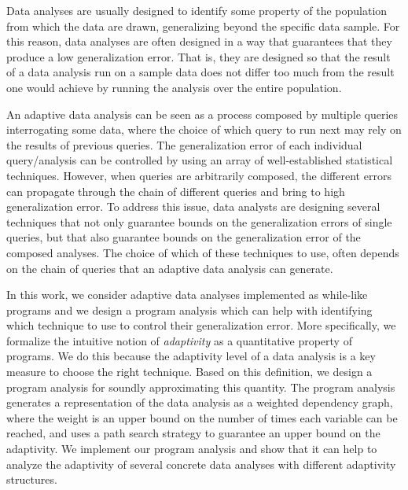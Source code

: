 Data analyses are usually designed to identify some property of the population from which the data are drawn, generalizing beyond the specific data sample. For this reason, data analyses are often designed in a way that guarantees that they produce a low generalization error.
   That is, they are designed so that the result of a data analysis run on a sample data does not differ too much from the result one would achieve by running the analysis over the entire population. 
   
   An adaptive data analysis can be seen as a process composed by multiple queries interrogating some data, where the choice of which query to run next may rely on the results of previous queries. 
   The generalization error of each individual query/analysis can be controlled by using an array of well-established statistical techniques.
   However, when queries are arbitrarily composed, the different errors can propagate through the chain of different queries and bring to high generalization error. 
   To address this issue, data analysts are designing several techniques that not only guarantee bounds on the generalization errors of single queries, but that also guarantee bounds on the generalization error of the composed analyses. 
   The choice of which of these techniques to use, often depends on the chain of queries that an adaptive data analysis can generate.
   
   In this work, we consider adaptive data analyses implemented as while-like programs and we design a program analysis which can help with identifying which technique to use to control their generalization error. 
   More specifically, we formalize the intuitive notion of \emph{adaptivity} as a quantitative property of programs. 
   We do this because the adaptivity level of a data analysis is a key measure to choose the right technique. 
   Based on this definition, we design a program analysis for soundly approximating this quantity.
   The program analysis generates a representation of the data analysis as a weighted dependency graph, where the weight is an upper bound on the number of times each variable can be reached, and uses a path search strategy to guarantee an upper bound on the adaptivity. 
   We implement our program analysis  and show that it can help to analyze the adaptivity of several concrete data analyses with different adaptivity structures.
